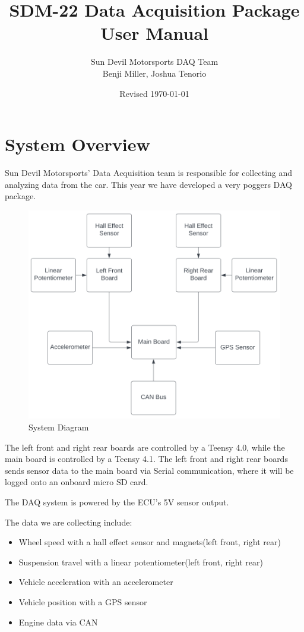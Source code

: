 \documentclass[12pt]{article}
\title{SDM-22 Data Acquisition Package\\User Manual}
\author{Sun Devil Motorsports DAQ Team\\Benji Miller, Joshua Tenorio}
\date{Revised \today}
\begin{document}
\maketitle
\tableofcontents
\pagebreak
\section{System Overview}
Sun Devil Motorsports' Data Acquisition team is responsible for collecting and analyzing data from the car.
This year we have developed a very poggers DAQ package.
\vspace{1em}

\begin{figure}[H]
    \includegraphics[width=\textwidth]{architecture.png}
    \caption{System Diagram}
\end{figure}
The left front and right rear boards are controlled by a Teensy 4.0, while the main board is controlled by a Teensy 4.1.
The left front and right rear boards sends sensor data to the main board via Serial communication, where it will be logged onto an onboard micro SD card.
\vspace{1em}

\noindent The DAQ system is powered by the ECU's 5V sensor output.

\pagebreak
The data we are collecting include:
\begin{itemize}
    \item Wheel speed with a hall effect sensor and magnets(left front, right rear)
    \item Suspension travel with a linear potentiometer(left front, right rear)
    \item Vehicle acceleration with an accelerometer
    \item Vehicle position with a GPS sensor
    \item Engine data via CAN
\end{itemize}
\end{document}
